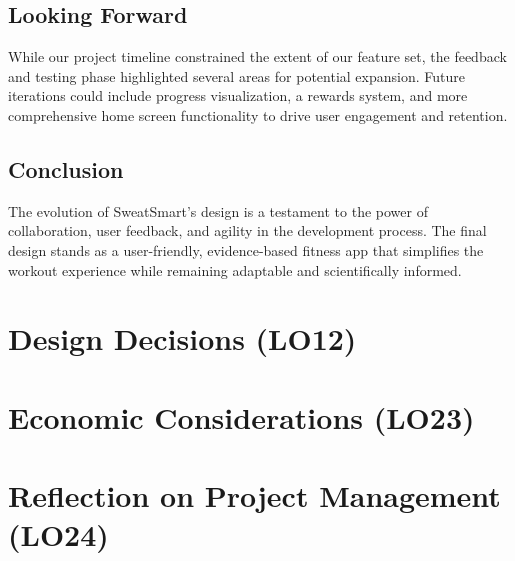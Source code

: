 \documentclass{article}
\begin{document}
\subsection{Looking Forward}
While our project timeline constrained the extent of our feature set, the feedback and testing phase highlighted several areas for potential expansion. Future iterations could include progress visualization, a rewards system, and more comprehensive home screen functionality to drive user engagement and retention.

\subsection{Conclusion}
The evolution of SweatSmart's design is a testament to the power of collaboration, user feedback, and agility in the development process. The final design stands as a user-friendly, evidence-based fitness app that simplifies the workout experience while remaining adaptable and scientifically informed.


\section{Design Decisions (LO12)}


\section{Economic Considerations (LO23)}


\section{Reflection on Project Management (LO24)}

\end{document}
